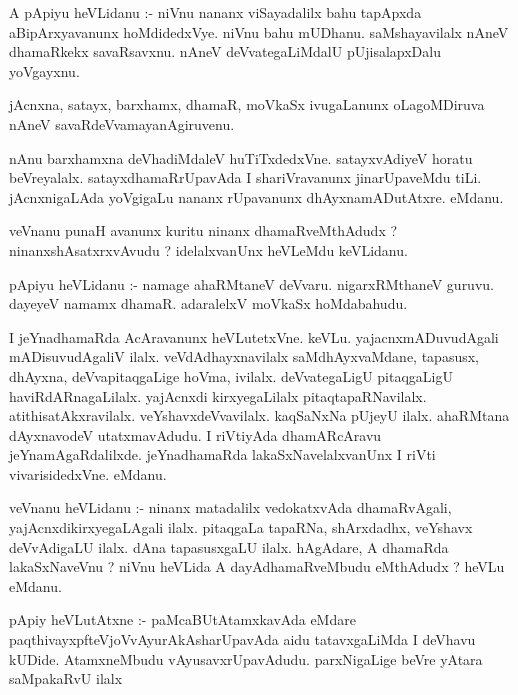 \documentclass{article}
\begin{document}
\begin{mn}
A pApiyu heVLidanu :- niVnu nananx viSayadalilx bahu tapApxda aBipArxyavanunx 
hoMdidedxVye.  niVnu bahu mUDhanu.  saMshayavilalx  nAneV dhamaRkekx savaRsavxnu.  
nAneV  deVvategaLiMdalU pUjisalapxDalu yoVgayxnu.
\end{mn}

\begin{mn}
jAcnxna, satayx, barxhamx, dhamaR, moVkaSx ivugaLanunx oLagoMDiruva nAneV savaRdeVvamayanAgiruvenu. 
\end{mn}

\begin{mn}
nAnu barxhamxna deVhadiMdaleV huTiTxdedxVne.  satayxvAdiyeV horatu beVreyalalx.  
satayxdhamaRrUpavAda I shariVravanunx jinarUpaveMdu tiLi.  jAcnxnigaLAda 
yoVgigaLu nananx rUpavanunx dhAyxnamADutAtxre.  eMdanu.
\end{mn}

\begin{mn}
veVnanu punaH avanunx kuritu ninanx dhamaRveMthAdudx ? ninanxshAsatxrxvAvudu ?  
idelalxvanUnx heVLeMdu keVLidanu.
\end{mn}

\begin{mn}
pApiyu heVLidanu :- namage ahaRMtaneV deVvaru.  nigarxRMthaneV guruvu.  
dayeyeV namamx dhamaR.  adaralelxV moVkaSx hoMdabahudu.
\end{mn}

\begin{mn}
I jeYnadhamaRda  AcAravanunx  heVLutetxVne.  keVLu.  yajacnxmADuvudAgali  mADisuvudAgaliV  
ilalx. veVdAdhayxnavilalx  saMdhAyxvaMdane, tapasusx, dhAyxna, deVvapitaqgaLige hoVma, 
ivilalx. deVvategaLigU pitaqgaLigU haviRdARnagaLilalx.  yajAcnxdi kirxyegaLilalx  
pitaqtapaRNavilalx.  atithisatAkxravilalx.  veYshavxdeVvavilalx.  kaqSaNxNa pUjeyU ilalx. 
ahaRMtana dAyxnavodeV utatxmavAdudu.  I riVtiyAda dhamARcAravu jeYnamAgaRdalilxde.  
jeYnadhamaRda  lakaSxNavelalxvanUnx I riVti vivarisidedxVne. eMdanu.
\end{mn}

\begin{mn}
veVnanu heVLidanu :- ninanx matadalilx vedokatxvAda dhamaRvAgali,  yajAcnxdikirxyegaLAgali 
ilalx.  pitaqgaLa tapaRNa, shArxdadhx, veYshavx deVvAdigaLU ilalx. dAna tapasusxgaLU ilalx.  
hAgAdare, A dhamaRda lakaSxNaveVnu ? niVnu heVLida A dayAdhamaRveMbudu eMthAdudx ?  heVLu eMdanu.
\end{mn}

\begin{mn}
pApiy heVLutAtxne :- paMcaBUtAtamxkavAda eMdare paqthivayxpfteVjoVvAyurAkAsharUpavAda aidu tatavxgaLiMda 
I deVhavu kUDide. AtamxneMbudu vAyusavxrUpavAdudu.  parxNigaLige beVre yAtara saMpakaRvU ilalx
\end{mn}
\end{document}
